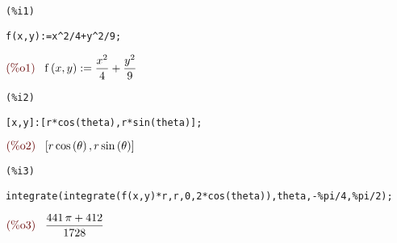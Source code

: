 \documentclass[12pt]{article}
\begin{document}
\noindent
\begin{minipage}[t]{8ex}{\color{red}\bf
\begin{verbatim}
(%i1) 
\end{verbatim}}
\end{minipage}
\begin{minipage}[t]{\textwidth}{\color{blue}
\begin{verbatim}
f(x,y):=x^2/4+y^2/9;
\end{verbatim}}
\end{minipage}
\begin{math}\displaystyle
\parbox{8ex}{\color{labelcolor}(\%o1) }
\mathrm{f}\left( x,y\right) :=\frac{{x}^{2}}{4}+\frac{{y}^{2}}{9}
\end{math}


\noindent
\begin{minipage}[t]{8ex}{\color{red}\bf
\begin{verbatim}
(%i2) 
\end{verbatim}}
\end{minipage}
\begin{minipage}[t]{\textwidth}{\color{blue}
\begin{verbatim}
[x,y]:[r*cos(theta),r*sin(theta)];
\end{verbatim}}
\end{minipage}
\begin{math}\displaystyle
\parbox{8ex}{\color{labelcolor}(\%o2) }
[r\,\mathrm{cos}\left( \theta\right) ,r\,\mathrm{sin}\left( \theta\right) ]
\end{math}


\noindent
\begin{minipage}[t]{8ex}{\color{red}\bf
\begin{verbatim}
(%i3) 
\end{verbatim}}
\end{minipage}
\begin{minipage}[t]{\textwidth}{\color{blue}
\begin{verbatim}
integrate(integrate(f(x,y)*r,r,0,2*cos(theta)),theta,-%pi/4,%pi/2);
\end{verbatim}}
\end{minipage}
\begin{math}\displaystyle
\parbox{8ex}{\color{labelcolor}(\%o3) }
\frac{441\,\pi +412}{1728}
\end{math}
\end{document}
